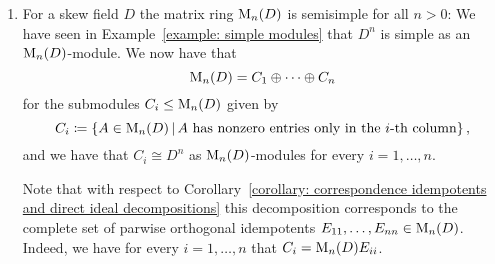 \begin{example}
\begin{enumerate}
    \item
      For a skew field $D$ the matrix ring $\operatorname{M}_n(D)$ is semisimple for all $n > 0$:
      We have seen in Example~\ref{example: simple modules} that $D^n$ is simple as an $\operatorname{M}_n(D)$-module.
      We now have that
      \[
          \operatorname{M}_n(D)
        = C_1 \oplus \dotsb \oplus C_n
      \]
      for the submodules $C_i \leq \operatorname{M}_n(D)$ given by 
      \[
                  C_i
        \defined  \{
                    A \in \Mat_n(D)
                  \suchthat
                    \text{$A$ has nonzero entries only in the $i$-th column}
                  \} \,,
      \]
      and we have that $C_i \cong D^n$ as $\operatorname{M}_n(D)$-modules for every $i = 1, \dotsc, n$.
      
      Note that with respect to Corollary~\ref{corollary: correspondence idempotents and direct ideal decompositions} this decomposition corresponds to the complete set of parwise orthogonal idempotents $E_{11}, \dotsc, E_{nn} \in \operatorname{M}_n(D)$.
      Indeed, we have for every $i = 1, \dotsc, n$ that $C_i = \operatorname{M}_n(D) E_{ii}$.
  \end{enumerate}
\end{example}









